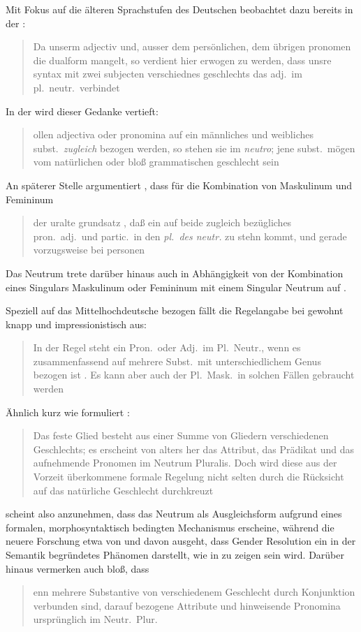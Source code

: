 Mit Fokus auf die älteren Sprachstufen des Deutschen beobachtet dazu bereits
\citeauthor{grimm1848} in der :
\blockcquote[978]{grimm1848}{Da unserm adjectiv und, ausser dem
persönlichen, dem übrigen pronomen die dualform mangelt, so verdient hier
erwogen zu werden, dass unsre syntax mit zwei subjecten verschiednes
geschlechts das adj.\ im pl.~neutr.\ verbindet}. In der  wird dieser Gedanke vertieft:
\blockcquote[311--312]{grimm1890}{ollen adjectiva oder pronomina
auf ein männliches und weibliches subst.\ \emph{zugleich} bezogen werden, so
stehen sie im \emph{neutro}; jene subst.\ mögen vom natürlichen oder bloß
grammatischen geschlecht sein}. An späterer Stelle argumentiert
\citeauthor{grimm1898}, dass für die Kombination von Maskulinum und Femininum
\blockcquote[329]{grimm1898}{der uralte grundsatz , daß ein auf
beide zugleich bezügliches pron.\ adj.\ und partic.\ in den \emph{pl.\ des
\mbox{neutr.}} zu stehn kommt, und gerade vorzugsweise bei personen}. Das
Neutrum trete darüber hinaus auch in Abhängigkeit von der Kombination eines
Singulars Maskulinum oder Femininum mit einem Singular Neutrum auf
\autocite[331]{grimm1898}.

Speziell auf das Mittelhochdeutsche bezogen fällt die
Regelangabe bei \citeauthor{paul2007} gewohnt knapp und impressionistisch aus:
\blockcquote[384]{paul2007}{In der Regel steht ein Pron.\ oder Adj.\ im
Pl.~Neutr., wenn es zusammenfassend auf mehrere Subst.\ mit unterschiedlichem
Genus bezogen ist \textelp{}. Es kann aber auch der Pl.~Mask.\ in solchen
Fällen gebraucht werden}. Ähnlich kurz wie \citet{paul2007} formuliert
\citet[39]{behaghel1928}: \blockquote{Das feste Glied besteht aus einer Summe
von Gliedern verschiedenen Geschlechts; es erscheint von alters her das
Attribut, das Prädikat und das aufnehmende Pronomen im Neutrum Pluralis.
\textelp{} Doch wird diese aus der Vorzeit überkommene formale Regelung nicht
selten durch die Rücksicht auf das natürliche Geschlecht durchkreuzt}.

\citet{behaghel1928} scheint also anzunehmen, dass das Neutrum als
Ausgleichsform aufgrund eines formalen, morphosyntaktisch bedingten Mechanismus
erscheine, während die neuere Forschung etwa von \citet{wechslerzlatic2003} und
\citet{wechsler2009} davon ausgeht, dass Gender Resolution ein in der Semantik
begründetes Phänomen darstellt, wie in  zu zeigen sein
wird. Darüber hinaus vermerken auch \citet[188]{dal2014} bloß, dass
\blockquote{enn mehrere Substantive von verschiedenem Geschlecht
durch Konjunktion verbunden sind, \textelp{} darauf bezogene Attribute und
hinweisende Pronomina ursprünglich im Neutr.\ Plur.\ }.

